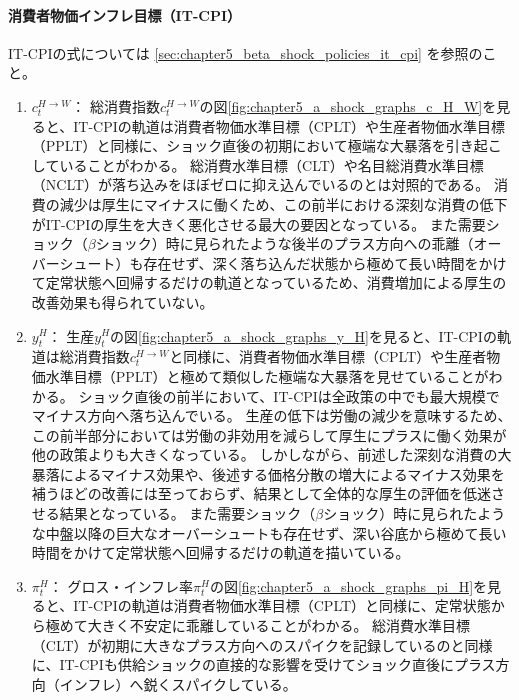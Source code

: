 \paragraph{消費者物価インフレ目標（IT-CPI）}
\label{sec:chapter5_a_shock_policies_it_cpi}
IT-CPIの式については
\ref{sec:chapter5_beta_shock_policies_it_cpi}
を参照のこと。
\begin{enumerate}
    \item
    \label{itm:chapter5_a_shock_policies_it_cpi_c_H_W}
        \(c_t^{H\to W}\)：
        総消費指数\(c_t^{H\to W}\)の図\ref{fig:chapter5_a_shock_graphs_c_H_W}を見ると、IT-CPIの軌道は消費者物価水準目標（CPLT）や生産者物価水準目標（PPLT）と同様に、ショック直後の初期において極端な大暴落を引き起こしていることがわかる。
        総消費水準目標（CLT）や名目総消費水準目標（NCLT）が落ち込みをほぼゼロに抑え込んでいるのとは対照的である。
        消費の減少は厚生にマイナスに働くため、この前半における深刻な消費の低下がIT-CPIの厚生を大きく悪化させる最大の要因となっている。
        また需要ショック（\(\beta\)ショック）時に見られたような後半のプラス方向への乖離（オーバーシュート）も存在せず、深く落ち込んだ状態から極めて長い時間をかけて定常状態へ回帰するだけの軌道となっているため、消費増加による厚生の改善効果も得られていない。
    \item
    \label{itm:chapter5_a_shock_policies_it_cpi_y_H}
        \(y_t^H\)：
        生産\(y_t^H\)の図\ref{fig:chapter5_a_shock_graphs_y_H}を見ると、IT-CPIの軌道は総消費指数\(c_t^{H\to W}\)と同様に、消費者物価水準目標（CPLT）や生産者物価水準目標（PPLT）と極めて類似した極端な大暴落を見せていることがわかる。
        ショック直後の前半において、IT-CPIは全政策の中でも最大規模でマイナス方向へ落ち込んでいる。
        生産の低下は労働の減少を意味するため、この前半部分においては労働の非効用を減らして厚生にプラスに働く効果が他の政策よりも大きくなっている。
        しかしながら、前述した深刻な消費の大暴落によるマイナス効果や、後述する価格分散の増大によるマイナス効果を補うほどの改善には至っておらず、結果として全体的な厚生の評価を低迷させる結果となっている。
        また需要ショック（\(\beta\)ショック）時に見られたような中盤以降の巨大なオーバーシュートも存在せず、深い谷底から極めて長い時間をかけて定常状態へ回帰するだけの軌道を描いている。
    \item
    \label{itm:chapter5_a_shock_policies_cplt_pi_H}
        \(\pi_t^H\)：
        グロス・インフレ率\(\pi_t^H\)の図\ref{fig:chapter5_a_shock_graphs_pi_H}を見ると、IT-CPIの軌道は消費者物価水準目標（CPLT）と同様に、定常状態から極めて大きく不安定に乖離していることがわかる。
        総消費水準目標（CLT）が初期に大きなプラス方向へのスパイクを記録しているのと同様に、IT-CPIも供給ショックの直接的な影響を受けてショック直後にプラス方向（インフレ）へ鋭くスパイクしている。

\end{enumerate}
